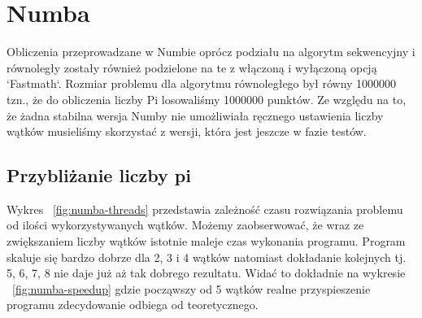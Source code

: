 \section{Numba}
Obliczenia przeprowadzane w Numbie oprócz podziału na algorytm sekwencyjny i równoległy
zostały również podzielone na te z włączoną i wyłączoną  opcją `Fastmath`.
Rozmiar problemu dla algorytmu równoległego był równy 1000000 tzn., że do obliczenia
liczby Pi losowaliśmy 1000000 punktów.
Ze względu na to, że żadna stabilna wersja Numby nie umożliwiała ręcznego ustawienia
liczby wątków musieliśmy skorzystać z wersji, która jest jeszcze w fazie testów.


\subsection{Przybliżanie liczby pi}

\begin{figure*}
    \centering
    \begin{minipage}[b]{.45\textwidth}
        \centering
        
        \caption{Przyspieszenie liczenia liczby $\pi$ w Numbie}
        \label{fig:numba-speedup}
    \end{minipage}
    \hfill
    \begin{minipage}[b]{.45\textwidth}
        \centering
        
        \caption{Czas wykonania algorytmu w Numbie w zależności od liczby wątków}
        \label{fig:numba-threads}
    \end{minipage}
\end{figure*}

\begin{figure*}
    \centering
    
    \caption{Czas równoległego wykonania algorytmu w Numbie w zależności od rozmiaru problemu}
    \label{fig:numba-parallel-sizes}
\end{figure*}

Wykres ~\ref{fig:numba-threads} przedstawia zależność czasu rozwiązania problemu
od ilości wykorzystywanych
wątków.
Możemy zaobserwować, że wraz ze zwiększaniem liczby wątków istotnie maleje czas
wykonania programu.
Program skaluje się bardzo dobrze dla 2, 3 i 4 wątków natomiast
dokładanie kolejnych tj. 5, 6, 7, 8 nie daje już aż tak dobrego rezultatu.
Widać to dokładnie
na wykresie ~\ref{fig:numba-speedup} gdzie począwszy od 5 wątków realne przyspieszenie
programu zdecydowanie odbiega od teoretycznego.




